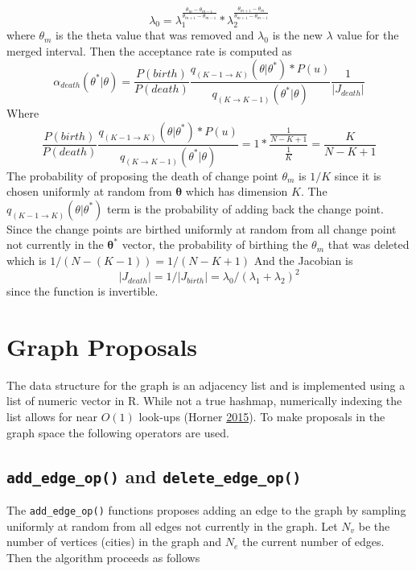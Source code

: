 \documentclass[11pt,a4paper]{article}
\numberwithin{equation}{section}
\begin{document}
\[ \lambda_0 =\lambda_1^{\frac{\theta_m-\theta_{m-1}}{\theta_{m+1}-\theta_{m-1}}}*\lambda_2^{\frac{\theta_{m+1}-\theta_{m}}{\theta_{m+1}-\theta_{m-1}}} \]
where \(\theta_m\) is the theta value that was removed and \(\lambda_0\)
is the new \(\lambda\) value for the merged interval. Then the
acceptance rate is computed as
\[\alpha_{death}(\theta^*|\theta) = \frac{P(birth)}{P(death)}\frac{q_{(K-1\rightarrow K)}(\theta|\theta^*)*P(u)}{q_{(K\rightarrow K - 1)}(\theta^*|\theta)}\frac{1}{|J_{death}|}\]
Where
\[ \frac{P(birth)}{P(death)}\frac{q_{(K-1\rightarrow K)}(\theta|\theta^*)*P(u)}{q_{(K\rightarrow K - 1)}(\theta^*|\theta)} = 1*\frac{\frac{1}{N-K+1}}{\frac{1}{K}} = \frac{K}{N-K+1} \]
The probability of proposing the death of change point \(\theta_m\) is
\(1/K\) since it is chosen uniformly at random from
\(\boldsymbol{\theta}\) which has dimension \(K\). The
\(q_{(K-1\rightarrow K)}(\theta|\theta^*)\) term is the probability of
adding back the change point. Since the change points are birthed
uniformly at random from all change point not currently in the
\(\boldsymbol{\theta^*}\) vector, the probability of birthing the
\(\theta_m\) that was deleted which is \(1/(N-(K-1)) = 1/(N-K+1)\) And
the Jacobian is
\[|J_{death}| = 1/|J_{birth}| = \lambda_0/(\lambda_1 + \lambda_2)^2\]
since the function is invertible.

\hypertarget{graph-proposals}{%
\section{Graph Proposals}\label{graph-proposals}}

The data structure for the graph is an adjacency list and is implemented
using a list of numeric vector in R. While not a true hashmap,
numerically indexing the list allows for near \(O(1)\) look-ups (Horner
\protect\hyperlink{ref-horner_hash_2015}{2015}). To make proposals in
the graph space the following operators are used.

\hypertarget{add_edge_op-and-delete_edge_op}{%
\subsection{\texorpdfstring{\texttt{add\_edge\_op()} and
\texttt{delete\_edge\_op()}}{add\_edge\_op() and delete\_edge\_op()}}\label{add_edge_op-and-delete_edge_op}}

The \texttt{add\_edge\_op()} functions proposes adding an edge to the
graph by sampling uniformly at random from all edges not currently in
the graph. Let \(N_v\) be the number of vertices (cities) in the graph
and \(N_e\) the current number of edges. Then the algorithm proceeds as
follows
\end{document}
